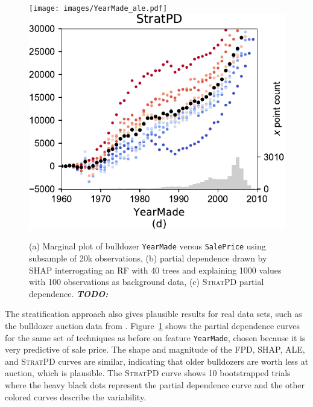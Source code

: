 \documentclass{article}
\newcommand{\figref}[1]{Figure~\ref{#1}}
\newcommand{\todo}[1]{{\bf\em TODO:} {{\color{red}{#1}}}}
\newcommand{\spd}{\fontfamily{cmr}\textsc{\small StratPD}}
\begin{document}
\begin{figure}[htbp]
\begin{center}
\texttt{[image: images/YearMade\_ale.pdf]}~~
\includegraphics[scale=0.35]{images/bulldozer_YearMade_stratpd.pdf}
\caption{\small (a) Marginal plot of bulldozer {\tt YearMade} versus {\tt SalePrice} using subsample of 20k observations, (b) partial dependence drawn by SHAP interrogating an RF with 40 trees and explaining 1000 values with 100 observations as background data, (c) \spd{} partial dependence. \todo{reuse rent10k.csv for our YearMade paper example}}
\label{fig:yearmade}
\end{center}
\end{figure}


The stratification approach also gives plausible results for real data sets, such as the bulldozer auction data from \cite{bulldozer}. \figref{fig:yearmade} shows the partial dependence curves for the same set of techniques as before on feature {\tt\small YearMade}, chosen because it is very predictive of sale price. The shape and magnitude of the FPD, SHAP, ALE, and \spd{} curves are similar, indicating that older bulldozers are worth less at auction, which is plausible. The \spd{} curve shows 10 bootstrapped trials where the heavy black dots represent the partial dependence curve and the other colored curves describe the variability. 
\end{document}
